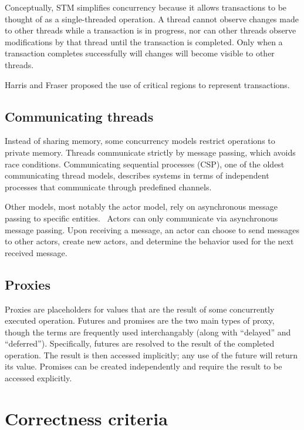 \documentclass{sig-alternate}
\begin{document}
Conceptually, STM simplifies concurrency because it allows transactions to be thought of as a single-threaded operation. A thread cannot observe changes made to other threads while a transaction is in progress, nor can other threads observe modifications by that thread until the transaction is completed. Only when a transaction completes successfully will changes will become visible to other threads.

Harris and Fraser proposed the use of critical regions to represent transactions.~\cite{Harris2014}

\subsection{Communicating threads}

Instead of sharing memory, some concurrency models restrict operations to private memory. Threads communicate strictly by message passing, which avoids race conditions. Communicating sequential processes (CSP), one of the oldest communicating thread models, describes systems in terms of independent processes that communicate through predefined channels.~\cite{Hoare1978}

Other models, most notably the actor model, rely on asynchronous message passing to specific entities.~\cite{Agha1986} Actors can only communicate via asynchronous message passing. Upon receiving a message, an actor can choose to send messages to other actors, create new actors, and determine the behavior used for the next received message.

\subsection{Proxies}

Proxies are placeholders for values that are the result of some concurrently executed operation. Futures and promises are the two main types of proxy, though the terms are frequently used interchangably (along with ``delayed'' and ``deferred''). Specifically, futures are resolved to the result of the completed operation. The result is then accessed implicitly; any use of the future will return its value. Promises can be created independently and require the result to be accessed explicitly.

\section{Correctness criteria}
\end{document}
